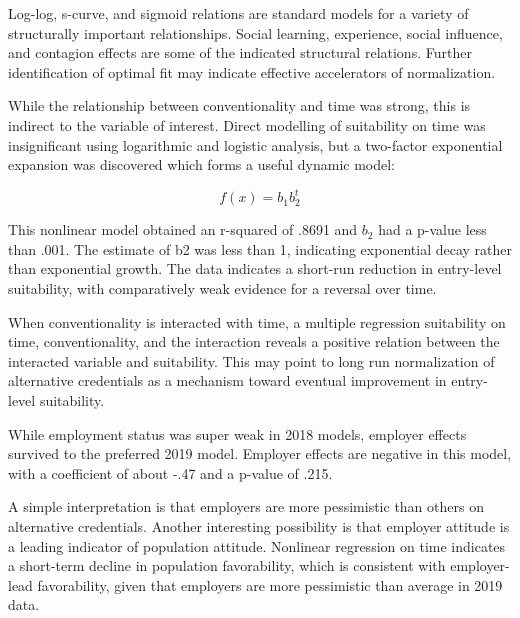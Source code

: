 \documentclass[AER]{./aea-latex-templates/AEA}
\begin{document}
        Log-log, s-curve, and sigmoid relations are standard models for a variety of structurally important relationships.
        Social learning, experience, social influence, and contagion effects are some of the
        indicated structural relations\cite{young2009innovation}.
        Further identification of optimal fit may indicate effective accelerators of normalization.
        
        While the relationship between conventionality and time was strong,
        this is indirect to the variable of interest. Direct modelling of suitability
        on time was insignificant using logarithmic and logistic analysis, but
        a two-factor exponential expansion was discovered which forms a useful dynamic model:
        
        \begin{equation} f(x) = b_1b_2^t \end{equation}
        
        This nonlinear model obtained an r-squared of .8691 and $b_2$ had a p-value
        less than .001. The estimate of b2 was less than 1, indicating exponential
        decay rather than exponential growth. The data indicates a short-run reduction in entry-level
        suitability, with comparatively weak evidence for a reversal over time.
        
        When conventionality is interacted with time, a multiple regression suitability on time, conventionality, and the interaction
        reveals a positive relation between the interacted variable and suitability.
        This may point to long run normalization of alternative credentials as a mechanism toward eventual improvement in entry-level suitability.
        
        While employment status was super weak in 2018 models,
        employer effects survived to the preferred 2019 model.
        Employer effects are negative in this model, with a coefficient of about -.47 and a p-value of .215.
        
        A simple interpretation is that employers are more pessimistic than others
        on alternative credentials. Another interesting possibility is that employer attitude is a leading indicator of population attitude.
        Nonlinear regression on time indicates a short-term decline in population favorability,
        which is consistent with employer-lead favorability, given that employers are more pessimistic than average in 2019 data.
        
\end{document}
